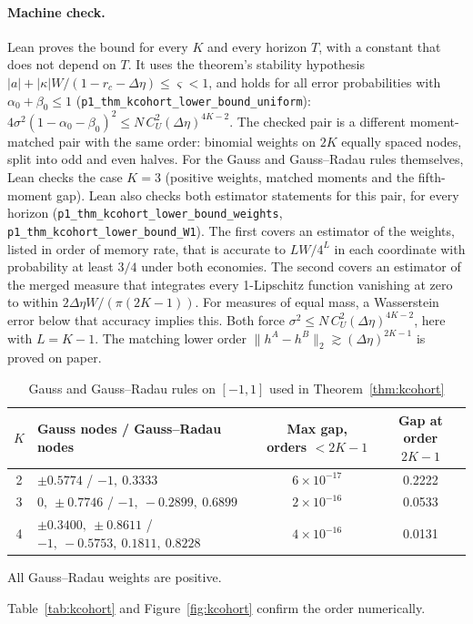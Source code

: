 \documentclass[12pt]{article}
\theoremstyle{definition}
\theoremstyle{remark}
\begin{document}
\paragraph{Machine check.} Lean proves the bound for every $K$ and every horizon $T$, with a constant that does not depend on $T$. It uses the theorem's stability hypothesis $|a|+|\kappa|W/(1-r_c-\Delta\eta)\le\varsigma<1$, and holds for all error probabilities with $\alpha_0+\beta_0\le1$ (\nolinkurl{p1_thm_kcohort_lower_bound_uniform}): $4\sigma^2(1-\alpha_0-\beta_0)^2\le N\,C_U^2(\Delta\eta)^{4K-2}$. The checked pair is a different moment-matched pair with the same order: binomial weights on $2K$ equally spaced nodes, split into odd and even halves. For the Gauss and Gauss--Radau rules themselves, Lean checks the case $K=3$ (positive weights, matched moments and the fifth-moment gap). Lean also checks both estimator statements for this pair, for every horizon (\nolinkurl{p1_thm_kcohort_lower_bound_weights}, \nolinkurl{p1_thm_kcohort_lower_bound_W1}). The first covers an estimator of the weights, listed in order of memory rate, that is accurate to $LW/4^L$ in each coordinate with probability at least $3/4$ under both economies. The second covers an estimator of the merged measure that integrates every 1-Lipschitz function vanishing at zero to within $2\Delta\eta W/(\pi(2K-1))$. For measures of equal mass, a Wasserstein error below that accuracy implies this. Both force $\sigma^2\le N\,C_U^2(\Delta\eta)^{4K-2}$, here with $L=K-1$. The matching lower order $\|h^A-h^B\|_2\gtrsim(\Delta\eta)^{2K-1}$ is proved on paper.

\begin{table}[t]\centering\small
\begin{threeparttable}
\caption{Gauss and Gauss--Radau rules on $[-1,1]$ used in Theorem~\ref{thm:kcohort}}\label{tab:radau}
\begin{tabular}{cp{}cc}
\toprule
$K$ & Gauss nodes / Gauss--Radau nodes & Max gap, orders $<2K-1$ & Gap at order $2K-1$\\
\midrule
2 & $\pm0.5774$ \;/\; $-1,\ 0.3333$ & $6\times10^{-17}$ & 0.2222\\
3 & $0,\ \pm0.7746$ \;/\; $-1,\ -0.2899,\ 0.6899$ & $2\times10^{-16}$ & 0.0533\\
4 & $\pm0.3400,\ \pm0.8611$ \;/\; $-1,\ -0.5753,\ 0.1811,\ 0.8228$ & $4\times10^{-16}$ & 0.0131\\
\bottomrule
\end{tabular}
\begin{tablenotes}\footnotesize\item All Gauss--Radau weights are positive. \end{tablenotes}
\end{threeparttable}
\end{table} Table~\ref{tab:kcohort} and Figure~\ref{fig:kcohort} confirm the order numerically.
\end{document}
